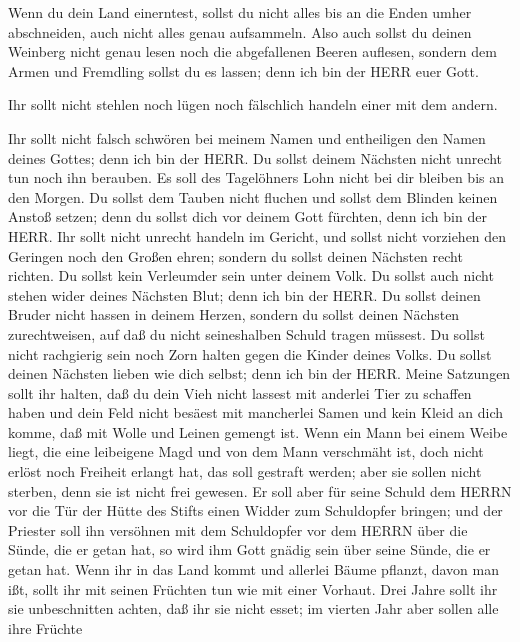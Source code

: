  Wenn du dein Land einerntest, sollst du nicht alles bis an
die Enden umher abschneiden, auch nicht alles genau aufsammeln.
 Also auch sollst du deinen Weinberg nicht genau lesen noch
die abgefallenen Beeren auflesen, sondern dem Armen und Fremdling sollst
du es lassen; denn ich bin der HERR euer Gott.

 Ihr sollt nicht stehlen noch lügen noch fälschlich handeln
einer mit dem andern.

 Ihr sollt nicht falsch schwören bei meinem Namen und
entheiligen den Namen deines Gottes; denn ich bin der HERR.
 Du sollst deinem Nächsten nicht unrecht tun noch ihn
berauben. Es soll des Tagelöhners Lohn nicht bei dir bleiben bis an den
Morgen.  Du sollst dem Tauben nicht fluchen und sollst dem
Blinden keinen Anstoß setzen; denn du sollst dich vor deinem Gott
fürchten, denn ich bin der HERR.  Ihr sollt nicht unrecht
handeln im Gericht, und sollst nicht vorziehen den Geringen noch den
Großen ehren; sondern du sollst deinen Nächsten recht richten.
 Du sollst kein Verleumder sein unter deinem Volk. Du
sollst auch nicht stehen wider deines Nächsten Blut; denn ich bin der
HERR.  Du sollst deinen Bruder nicht hassen in deinem
Herzen, sondern du sollst deinen Nächsten zurechtweisen, auf daß du
nicht seineshalben Schuld tragen müssest.  Du sollst nicht
rachgierig sein noch Zorn halten gegen die Kinder deines Volks. Du
sollst deinen Nächsten lieben wie dich selbst; denn ich bin der HERR.
 Meine Satzungen sollt ihr halten, daß du dein Vieh nicht
lassest mit anderlei Tier zu schaffen haben und dein Feld nicht besäest
mit mancherlei Samen und kein Kleid an dich komme, daß mit Wolle und
Leinen gemengt ist.  Wenn ein Mann bei einem Weibe liegt,
die eine leibeigene Magd und von dem Mann verschmäht ist, doch nicht
erlöst noch Freiheit erlangt hat, das soll gestraft werden; aber sie
sollen nicht sterben, denn sie ist nicht frei gewesen.  Er
soll aber für seine Schuld dem HERRN vor die Tür der Hütte des Stifts
einen Widder zum Schuldopfer bringen;  und der Priester
soll ihn versöhnen mit dem Schuldopfer vor dem HERRN über die Sünde, die
er getan hat, so wird ihm Gott gnädig sein über seine Sünde, die er
getan hat.  Wenn ihr in das Land kommt und allerlei Bäume
pflanzt, davon man ißt, sollt ihr mit seinen Früchten tun wie mit einer
Vorhaut. Drei Jahre sollt ihr sie unbeschnitten achten, daß ihr sie
nicht esset;  im vierten Jahr aber sollen alle ihre Früchte
